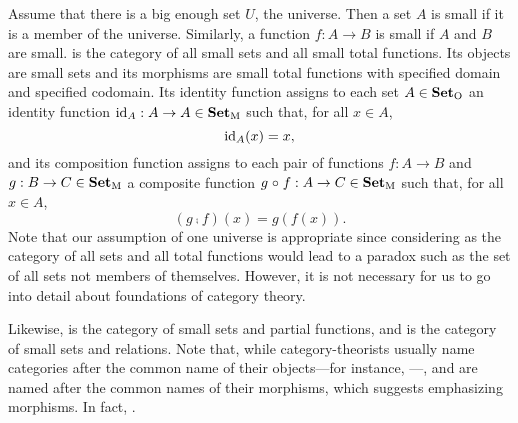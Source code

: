 \begin{example}
  \label{ex:set}



  Assume that there is a big enough set $U$, the universe. Then a set
  $A$ is small if it is a member of the universe. Similarly, a
  function $f: A \to B$ is small if $A$ and $B$ are small. \set is the
  category of all small sets and all small total functions. Its
  objects are small sets and its morphisms are small total functions
  with specified domain and specified codomain. Its identity function
  assigns to each set $A \in \mathcal{\mathbf{Set}}_{\operatorname{O}}$ an identity function
  $\operatorname{id}_{A}: A \to A \in \mathcal{\mathbf{Set}}_{\operatorname{M}}$ such that, for all $x \in A$,
  \begin{equation}
    \label{eq:set-identity}
    \operatorname{id}_{A}(x) = x
    \text{,}
  \end{equation}
  and its composition function assigns to each pair of functions $f: A
  \to B$ and $g: B \to C \in \mathcal{\mathbf{Set}}_{\operatorname{M}}$ a composite function $g
  \mathrel{\circ} f: A \to C \in \mathcal{\mathbf{Set}}_{\operatorname{M}}$ such that, for all $x \in A$,
  \begin{equation}
    \label{eq:set-composition}
    (g \comp f)(x) = g(f(x))
    \text{.}
  \end{equation}
  Note that our assumption of one universe is appropriate since
  considering \set as the category of all sets and all total functions
  would lead to a paradox such as the set of all sets not members of
  themselves. However, it is not necessary for us to go into detail
  about foundations of category theory.

\end{example}

\begin{example}
  \label{ex:par-rel}


  Likewise,  is the category of small sets and partial
  functions, and  is the category of small sets and
  relations. Note that, while category-theorists usually name
  categories after the common name of their objects---for instance,
  \set---,  and  are named after the common
  names of their morphisms, which suggests emphasizing morphisms. In
  fact, .

\end{example}

